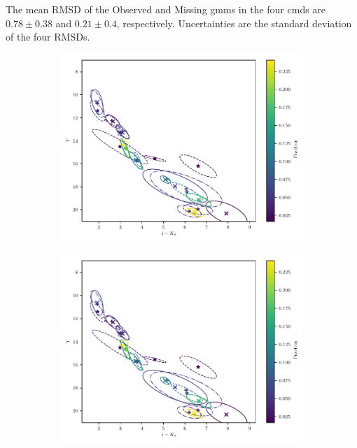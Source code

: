 The mean RMSD of the Observed  and Missing \glspl{gmm} in the four \glspl{cmd} are $0.78\pm0.38$ and $0.21\pm0.4$, respectively. Uncertainties are the standard deviation of the four RMSDs.

\begin{figure}[ht!]
\begin{center}
\begin{subfigure}[t]{0.45\textwidth}
\includegraphics[page=2,width=\textwidth]{./background/Figures/validationMissing.pdf}
\end{subfigure}
\begin{subfigure}[t]{0.45\textwidth}
\includegraphics[page=4,width=\textwidth]{./background/Figures/validationMissing.pdf}

\end{subfigure}
\end{center}
\end{figure}
